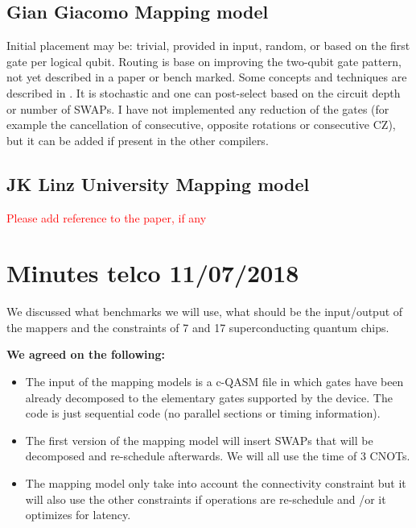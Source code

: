 \documentclass[11pt]{article}
\begin{document}
\subsection{Gian Giacomo Mapping model}

Initial placement may be: trivial, provided in input, random, or based on the first gate per logical qubit. Routing is base on improving the two-qubit gate pattern, not yet described in a paper or bench marked. Some concepts and techniques are described in \cite{Guerreschi2018}. It is stochastic and one can post-select based on the circuit depth or number of SWAPs. I have not implemented any reduction of the gates (for example the cancellation of consecutive, opposite rotations or consecutive CZ), but it can be added if present in the other compilers.

\subsection{JK Linz University Mapping model}
\textcolor{red}{Please add reference to the paper, if any}
\newpage

\section{Minutes telco 11/07/2018}

We discussed what benchmarks we will use, what should be the input/output of the mappers and the constraints of 7 and 17 superconducting quantum chips.

\textbf{We agreed on the following:}

\begin{itemize}
    \item The input of the mapping models is a c-QASM file in which gates have been already decomposed to the elementary gates supported by the device. The code is just sequential code (no parallel sections or timing information).
    
    \item The first version of the mapping model will insert SWAPs that will be decomposed and re-schedule afterwards. We will all use the time of 3 CNOTs.
    
    \item The mapping model only take into account the connectivity constraint but it will also use the other constraints if operations are re-schedule and /or it optimizes for latency. 
    
    \end{itemize}
\end{document}
